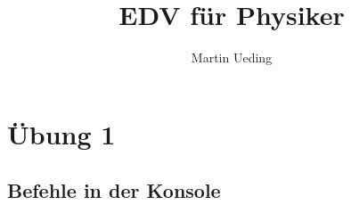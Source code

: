 \documentclass[10pt]{article}
\title{EDV für Physiker}
\author{Martin Ueding}
\begin{document}
\maketitle

\tableofcontents
\newpage



\section{Übung 1}

\subsection{Befehle in der Konsole}
\label{commands}
\end{document}

